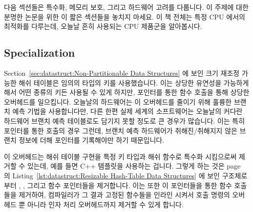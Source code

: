 다음 섹션들은 특수화, 메모리 보호, 그리고 하드웨어 고려를 다룹니다.
이 주제에 대한 분명한 논문을 위한 이 짧은 섹션들을 놓치지 마세요.
이 책 전체는 특정 CPU 에서의 최적화를 다루는데, 오늘날 흔히 사용되는 CPU
제품군을 알아봅시다.

\subsection{Specialization}
\label{sec:datastruct:Specialization}

Section~\ref{sec:datastruct:Non-Partitionable Data Structures}
에 보인 크기 재조정 가능한 해쉬 테이블은 임의의 타입의 키를 사용했습니다.
이는 상당한 유연성을 가능하게 해서 어떤 종류의 키든 사용될 수 있게 하지만,
포인터를 통한 함수 호출을 통해 상당한 오버헤드를 일으킵니다.
오늘날의 하드웨어는 이 오버헤드를 줄이기 위해 훌륭한 브랜치 예측 기법을
사용합니다만, 다른 한편 실제 세계의 소프트웨어는 오늘날의 커다란 하드웨어
브랜치 예측 테이블로도 담기지 못할 정도로 큰 경우가 많습니다.
이는 특히 포인터를 통한 호출의 경우 그런데, 브랜치 예측 하드웨어가
취해진/취해지지 않은 브랜치 정보에 더해 포인터를 기록해야만 하기 때문입니다.

이 오버헤드는 해쉬 테이블 구현을 특정 키 타입과 해쉬 함수로 특수화 시킴으로써
제거할 수 있는데, 예를 들면 C++ 템플릿을 사용하는 겁니다.
그렇게 하는 것은
page~\pageref{lst:datastruct:Resizable Hash-Table Data Structures} 의
Listing~\ref{lst:datastruct:Resizable Hash-Table Data Structures} 에 보인
 구조체로부터 , , 그리고
 함수 포인터들을 제거합니다.
이는 또한 이 포인터들을 통한 함수 호출들을 제거하여, 컴파일러가 그 결과 고정된
함수들을 인라인 시켜서 호출 명령의 오버헤드 뿐 아니라 인자 처리 오버헤드까지
제거할 수 있게 합니다.


